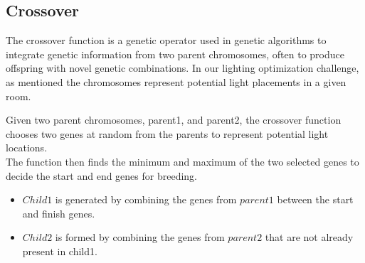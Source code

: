 \documentclass[conference]{IEEEtran}
\begin{document}
\subsection{Crossover}
The crossover function is a genetic operator used in genetic algorithms to integrate genetic information from two parent chromosomes, often to produce offspring with novel genetic combinations. In our lighting optimization challenge, as mentioned the chromosomes represent potential light placements in a given room.

Given two parent chromosomes, parent1, and parent2, the crossover function chooses two genes at random from the parents to represent potential light locations.\\

The function then finds the minimum and maximum of the two selected genes to decide the start and end genes for breeding.
\begin{itemize}
    \item $Child1$ is generated by combining the genes from $parent1$ between the start and finish genes.
    \item $Child2$ is formed by combining the genes from $parent2$ that are not already present in child1.\\
\end{itemize}
\end{document}
